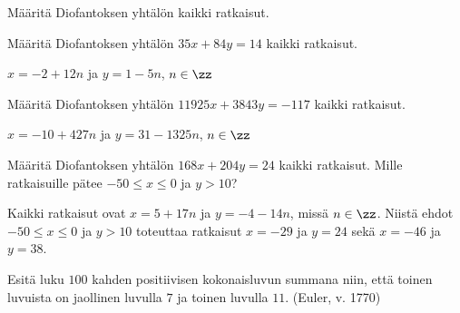 \begin{kotitehtavasivu}
\begin{tehtava}
\end{tehtava}

\begin{tehtava}
    Määritä Diofantoksen yhtälön kaikki ratkaisut.

    \begin{vastaus}
    \end{vastaus}
    
\end{tehtava}

\begin{tehtava}
    Määritä Diofantoksen yhtälön $35x + 84y = 14$ kaikki ratkaisut.
    
    \begin{vastaus}
        $x = -2 + 12n$ ja $y = 1 - 5n$, $n\in\zz$
    \end{vastaus}
    
\end{tehtava}

\begin{tehtava}
    Määritä Diofantoksen yhtälön $11925x + 3843y = -117$ kaikki ratkaisut.
    
    \begin{vastaus}
        $x = -10 + 427n$ ja $y = 31 - 1325n$, $n\in\zz$
    \end{vastaus}
    
\end{tehtava}

\begin{tehtava}
    Määritä Diofantoksen yhtälön $168x + 204y = 24$ kaikki ratkaisut. Mille ratkaisuille pätee $-50 \le x \le 0$ ja $y > 10$?
    
    \begin{vastaus}
        Kaikki ratkaisut ovat $x = 5 + 17n$ ja $y = -4 - 14n$, missä $n\in\zz$. Niistä ehdot $-50 \le x \le 0$ ja $y > 10$ toteuttaa ratkaisut $x = -29$ ja $y = 24$ sekä $x = -46$ ja $y = 38$.
    \end{vastaus}
    
\end{tehtava}

\begin{tehtava}
    Esitä luku $100$ kahden positiivisen kokonaisluvun summana niin, että toinen luvuista on jaollinen luvulla $7$ ja toinen luvulla $11$. (Euler, v. 1770)
    

\end{tehtava}
\end{kotitehtavasivu}
